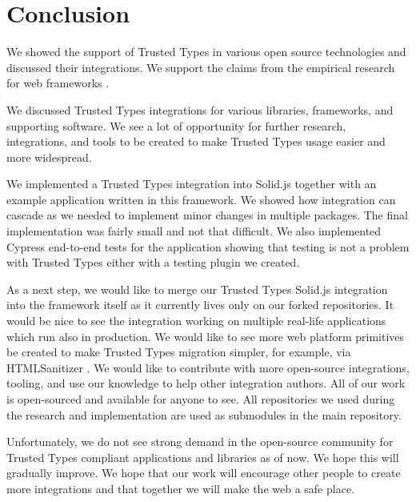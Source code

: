 \chapter{Conclusion}


We showed the support of Trusted Types in various open source technologies and discussed their
integrations. We support the claims from the empirical research for web frameworks
\cite{tt_web_framework_paper}.

We discussed Trusted Types integrations for various libraries, frameworks, and supporting software.
We see a lot of opportunity for further research, integrations, and tools to be created to make
Trusted Types usage easier and more widespread.

We implemented a Trusted Types integration into Solid.js together with an example application
written in this framework. We showed how integration can cascade as we needed to implement minor
changes in multiple packages. The final implementation was fairly small and not that difficult. We
also implemented Cypress end-to-end tests for the application showing that testing is not a problem
with Trusted Types either with a testing plugin we created.

As a next step, we would like to merge our Trusted Types Solid.js integration into the framework
itself as it currently lives only on our forked repositories. It would be nice to see the
integration working on multiple real-life applications which run also in production. We would like
to see more web platform primitives be created to make Trusted Types migration simpler, for example,
via HTMLSanitizer \cite{tt_report_mid2021}. We would like to contribute with more open-source
integrations, tooling, and use our knowledge to help other integration authors. All of our work is
open-sourced and available for anyone to see. All repositories we used during the research and
implementation are used as submodules in the main repository.

Unfortunately, we do not see strong demand in the open-source community for Trusted Types
compliant applications and libraries as of now. We hope this will gradually improve. We hope that
our work will encourage other people to create more integrations and that together we will make the
web a safe place.
